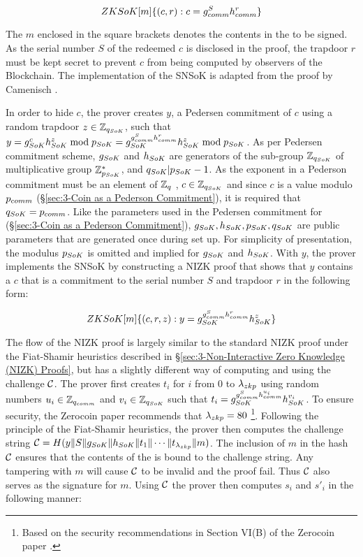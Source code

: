 $$ZKSoK[m]\{(c,r):c=g_{comm}^Sh_{comm}^r\}$$

The $m$ enclosed in the square brackets denotes the contents in the  to be signed. As the serial number $S$ of the redeemed $c$ is disclosed in the proof, the trapdoor $r$ must be kept secret to prevent $c$ from being computed by observers of the Blockchain. The implementation of the SNSoK is adapted from the proof by Camenisch \cite{No1998}.

In order to hide $c$, the prover creates $y$, a Pedersen commitment of $c$ using a random trapdoor $z\in\mathbb{Z}_{q_{SoK}}$, such that $y=g_{SoK}^{c}h_{SoK}^{z}\bmod{p_{SoK}}=g_{SoK}^{g_{comm}^{S}h_{comm}^{r}}h_{SoK}^{z}\bmod{p_{SoK}}$. As per Pedersen commitment scheme, $g_{SoK}$ and $h_{SoK}$ are generators of the sub-group $\mathbb{Z}_{q_{SoK}}$ of multiplicative group $\mathbb{Z}_{p_{SoK}}^{*}$, and $q_{SoK}|p_{SoK}-1$. As the exponent in a Pederson commitment must be an element of $\mathbb{Z}_{q}$ \cite{Pedersen1992}, $c\in\mathbb{Z}_{q_{SoK}}$ and since $c$ is a value modulo $p_{comm}$ (\S\ref{sec:3-Coin as a Pederson Commitment}), it is required that $q_{SoK}=p_{comm}$. Like the parameters used in the Pedersen commitment for  (\S\ref{sec:3-Coin as a Pederson Commitment}), $g_{SoK},h_{SoK},p_{SoK},q_{SoK}$ are public parameters that are generated once during set up. For simplicity of presentation, the modulus $p_{SoK}$ is omitted and implied for $g_{SoK}$ and $h_{SoK}$. With $y$, the prover implements the SNSoK by constructing a NIZK proof that shows that $y$ contains a $c$ that is a commitment to the serial number $S$ and trapdoor $r$ in the following form:

$$ZKSoK[m]\{(c,r,z):y=g_{SoK}^{g_{comm}^{S}h_{comm}^{r}}h_{SoK}^{z}\}$$

The flow of the NIZK proof is largely similar to the standard NIZK proof under the Fiat-Shamir heuristics described in \S\ref{sec:3-Non-Interactive Zero Knowledge (NIZK) Proofs}, but has a slightly different way of computing and using the challenge $\mathcal{C}$. The prover first creates $t_i$ for $i$ from 0 to $\lambda_{zkp}$ using random numbers $u_i\in\mathbb{Z}_{q_{comm}}$ and $v_i\in\mathbb{Z}_{q_{SoK}}$ such that $t_i=g_{SoK}^{g_{comm}^{S}h_{comm}^{u_i}}h_{SoK}^{v_i}$. To ensure security, the Zerocoin paper recommends that $\lambda_{zkp}=80$ \footnote{Based on the security recommendations in Section VI(B) of the Zerocoin paper \cite{Miers2013}.}. Following the principle of the Fiat-Shamir heuristics, the prover then computes the challenge string $\mathcal{C}=H(y \| S \| g_{SoK} \| h_{SoK} \| t_1 \| \cdots \| t_{\lambda_{zkp}} \| m)$. The inclusion of $m$ in the hash $\mathcal{C}$ ensures that the contents of the  is bound to the challenge string. Any tampering with $m$ will cause $\mathcal{C}$ to be invalid and the proof fail. Thus $\mathcal{C}$ also serves as the signature for $m$. Using $\mathcal{C}$ the prover then computes $s_i$ and $s'_i$ in the following manner:

